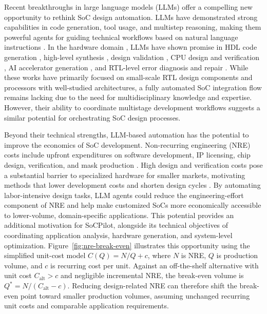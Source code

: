 Recent breakthroughs in large language models (LLMs) \cite{minaee2025largelanguagemodelssurvey} offer a compelling new opportunity to rethink SoC design automation. LLMs have demonstrated strong capabilities in code generation, tool usage, and multistep reasoning, making them powerful agents for guiding technical workflows based on natural language instructions \cite{dong2024selfcollaboration, paria2024llmsocsecurity}. In the hardware domain \cite{Chen_2024}, LLMs have shown promise in HDL code generation \cite{blocklove2025automaticallyimprovingllmbasedverilog, morgan2024hdlgen}, high-level synthesis \cite{xiong2024hlspilot, collini2024c2hlsc}, design validation \cite{wan2024llmverificationcodesign, paria2024spell}, CPU design and verification \cite{processor-verification, ChatCPU}, AI accelerator generation \cite{fu2023gpt4aigchip}, and RTL-level error diagnosis and repair \cite{tsai2024rtlfixerautomaticallyfixingrtl}.
While these works have primarily focused on small-scale RTL design components and processors with well-studied architectures, a fully automated SoC integration flow remains lacking due to the need for multidisciplinary knowledge and expertise. However, their ability to coordinate multistage development workflows \cite{sonkin2025workflowcodegen} suggests a similar potential for orchestrating SoC design processes.

Beyond their technical strengths, LLM-based automation has the potential to improve the economics of SoC development. Non-recurring engineering (NRE) costs include upfront expenditures on software development, IP licensing, chip design, verification, and mask production \cite{chen2025chipletsurvey}. High design and verification costs pose a substantial barrier to specialized hardware for smaller markets, motivating methods that lower development costs and shorten design cycles \cite{shalf2020future}. By automating labor-intensive design tasks, LLM agents could reduce the engineering-effort component of NRE and help make customized SoCs more economically accessible to lower-volume, domain-specific applications. This potential provides an additional motivation for SoCPilot, alongside its technical objectives of coordinating application analysis, hardware generation, and system-level optimization. Figure~\ref{fig:nre-break-even} illustrates this opportunity using the simplified unit-cost model $C(Q)=N/Q+c$, where $N$ is NRE, $Q$ is production volume, and $c$ is recurring cost per unit. Against an off-the-shelf alternative with unit cost $C_{\mathrm{alt}}>c$ and negligible incremental NRE, the break-even volume is $Q^*=N/(C_{\mathrm{alt}}-c)$. Reducing design-related NRE can therefore shift the break-even point toward smaller production volumes, assuming unchanged recurring unit costs and comparable application requirements.

